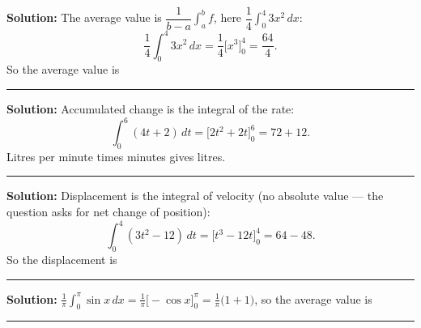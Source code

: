 \documentclass[12pt]{article}
\begin{document}



\textbf{Solution:} The average value is $\dfrac{1}{b-a}\displaystyle\int_a^b f$, here $\dfrac{1}{4}\displaystyle\int_0^4 3x^2\,dx$:
\[ \frac{1}{4}\int_0^4 3x^2\,dx = \frac{1}{4}\Big[x^3\Big]_0^4 = \frac{64}{4}. \]
So the average value is 

\vspace{0.2cm}\noindent\rule{\linewidth}{0.2pt}\vspace{0.2cm}


\textbf{Solution:} Accumulated change is the integral of the rate:
\[ \int_0^6 (4t + 2)\,dt = \Big[2t^2 + 2t\Big]_0^6 = 72 + 12. \]
Litres per minute times minutes gives litres. 

\vspace{0.2cm}\noindent\rule{\linewidth}{0.2pt}\vspace{0.2cm}


\textbf{Solution:} Displacement is the integral of velocity (no absolute value --- the question asks for net change of position):
\[ \int_0^4 (3t^2 - 12)\,dt = \Big[t^3 - 12t\Big]_0^4 = 64 - 48. \]
So the displacement is 

\vspace{0.2cm}\noindent\rule{\linewidth}{0.2pt}\vspace{0.2cm}


\textbf{Solution:} $\displaystyle \frac{1}{\pi}\int_0^{\pi}\sin x\,dx = \frac{1}{\pi}\Big[-\cos x\Big]_0^{\pi} = \frac{1}{\pi}\big(1 + 1\big)$, so the average value is 

\vspace{0.2cm}\noindent\rule{\linewidth}{0.2pt}\vspace{0.2cm}

\end{document}
